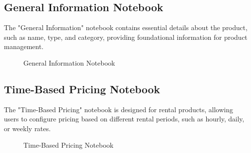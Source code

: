 \subsection{General Information Notebook}
The "General Information" notebook contains essential details about the product, such as name, type, and category, providing foundational information for product management.
\begin{figure}[!h]
    \centering
    \caption{General Information Notebook}
    \label{fig:general_information}
\end{figure}
\newpage

\subsection{Time-Based Pricing Notebook}
The "Time-Based Pricing" notebook is designed for rental products, allowing users to configure pricing based on different rental periods, such as hourly, daily, or weekly rates.
\begin{figure}[h]
    \centering
    \caption{Time-Based Pricing Notebook}
    \label{fig:time_based_pricing}
\end{figure}

